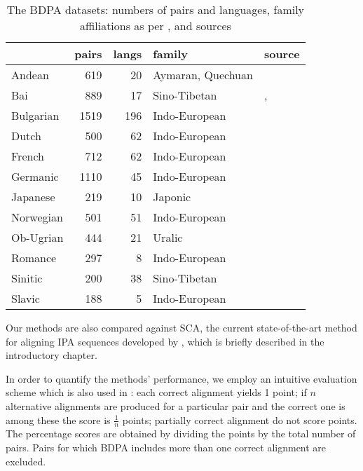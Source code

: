 \documentclass[a4paper]{report}
\begin{document}
\begin{table}[h]
	\centering\small
	\begin{tabular}{l r r l l}
		\toprule
		& pairs & langs & family & source \\
		\midrule
		Andean		& 619	& 20	& Aymaran, Quechuan	& \citet{2006_Heggarty} \\
		Bai			& 889	& 17	& Sino-Tibetan		& \citet{2006_Wang}, \citet{2007_Allen} \\
		Bulgarian	& 1519	& 196	& Indo-European		& \citet{2009_Prokić_al} \\
		Dutch		& 500	& 62	& Indo-European		& \citet{2005_Schutter_al} \\
		French		& 712	& 62	& Indo-European		& \citet{1925_Gauchat_al} \\
		Germanic	& 1110	& 45	& Indo-European		& \citet{2009_Renfrew_Heggarty} \\
		Japanese	& 219	& 10	& Japonic			& \citet{1973_Shirō} \\
		Norwegian	& 501	& 51	& Indo-European		& \citet{2011_Almberg_Skarbø} \\
		Ob-Ugrian	& 444	& 21	& Uralic			& \citet{2011_Zhivlov} \\
		Romance		& 297	& 8		& Indo-European		& \citet{2009_Renfrew_Heggarty} \\
		Sinitic		& 200	& 38	& Sino-Tibetan		& \citet{2004_Hóu} \\
		Slavic		& 188	& 5		& Indo-European		& \citet{2008_Derksen} \\
		\bottomrule
	\end{tabular}
	\caption{The BDPA datasets: numbers of pairs and languages, family affiliations as per \citet{2018_Hammarström_al}, and sources}
	\label{tab:bdpa}
\end{table}

Our methods are also compared against SCA, the current state-of-the-art method for aligning IPA sequences developed by \citet{2012_List},
which is briefly described in the introductory chapter.

In order to quantify the methods' performance, we employ an intuitive evaluation scheme which is also used in \citet{2002_Kondrak_Hirst}:
each correct alignment yields 1 point;
if $n$ alternative alignments are produced for a particular pair and the correct one is among these the score is $\frac{1}{n}$ points;
partially correct alignment do not score points.
The percentage scores are obtained by dividing the points by the total number of pairs.
Pairs for which BDPA includes more than one correct alignment are excluded.
\end{document}
